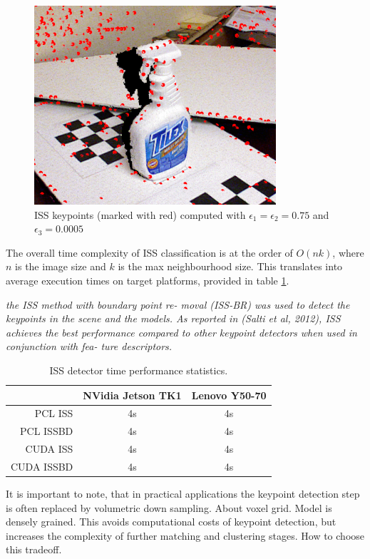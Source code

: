 \begin{figure}[h]
\centering
\includegraphics[width=0.8\textwidth]{fig/ISS}
\caption{ISS keypoints (marked with red) computed with $\epsilon_1 =  \epsilon_2 = 0.75$ and $\epsilon_3 = 0.0005$ }
\label{fig:iss}
\end{figure}

The overall time complexity of ISS classification is at the order of $O(nk)$, where $n$ is the image size and $k$ is the max neighbourhood size. This translates into average execution times on target platforms, provided in table \ref{tab:issexec}.

\textit{the ISS method with boundary point re-
moval (ISS-BR) was used to detect the keypoints in the
scene and the models. As reported in (Salti et al, 2012),
ISS achieves the best performance compared to other
keypoint detectors when used in conjunction with fea-
ture descriptors.}

\begin{table}[h]
\centering
\begin{tabular}{r || c | c}
& NVidia Jetson TK1 & Lenovo Y50-70 \\
 \hline
 \hline
 PCL ISS& 4s & 4s \\
 PCL ISSBD& 4s &  4s \\
 CUDA ISS& 4s & 4s \\
 CUDA ISSBD& 4s & 4s
\end{tabular}
\caption{ISS detector time performance statistics.}
\label{tab:issexec}
\end{table}

It is important to note, that in practical applications the keypoint detection step is often replaced by volumetric down sampling. About voxel grid. Model is densely grained. This avoids computational costs of keypoint detection, but increases the complexity of further matching and clustering stages. How to choose this tradeoff.

